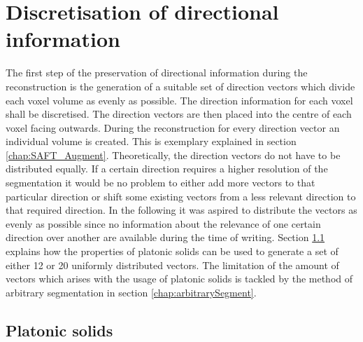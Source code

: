 \section{Discretisation of directional information}
\label{chap:segmentation}


The first step of the preservation of directional information during the reconstruction is the generation of a suitable set of direction vectors which divide each voxel volume as evenly as possible. The direction information for each voxel shall be discretised. The direction vectors are then placed into the centre of each voxel facing outwards. During the reconstruction for every direction vector an individual volume is created. This is exemplary explained in section \ref{chap:SAFT_Augment}. Theoretically, the direction vectors do not have to be distributed equally. If a certain direction requires a higher resolution of the segmentation it would be no problem to either add more vectors to that particular direction or shift some existing vectors from a less relevant direction to that required direction. In the following it was aspired to distribute the vectors as evenly as possible since no information about the relevance of one certain direction over another are available during the time of writing.
Section \ref{chap:platonicsolids} explains how the properties of platonic solids can be used to generate a set of either 12 or 20 uniformly distributed vectors. The limitation of the amount of vectors which arises with the usage of platonic solids is tackled by the method of arbitrary segmentation in section \ref{chap:arbitrarySegment}.







\subsection{Platonic solids}
\label{chap:platonicsolids}

